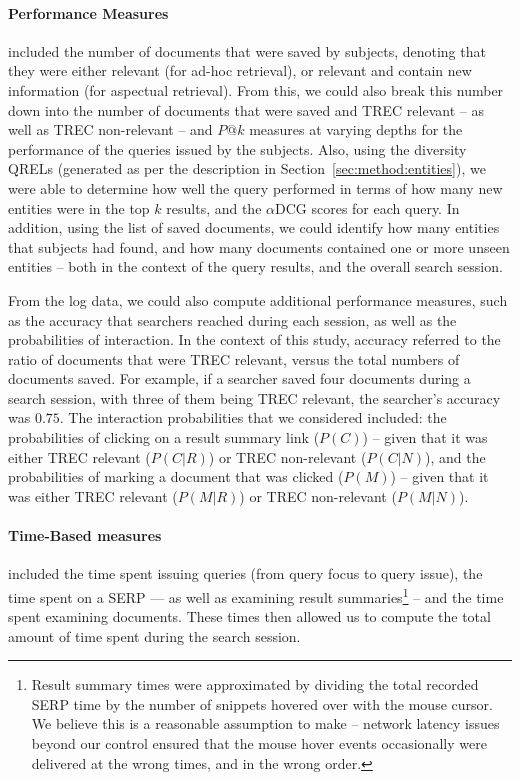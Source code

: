 \paragraph{Performance Measures} included the number of documents that were saved by subjects, denoting that they were either relevant (for ad-hoc retrieval), or relevant and contain new information (for aspectual retrieval). From this, we could also break this number down into the number of documents that were saved and TREC relevant -- as well as TREC non-relevant -- and $P@k$ measures at varying depths for the performance of the queries issued by the subjects. Also, using the diversity QRELs (generated as per the description in Section~\ref{sec:method:entities}), we were able to determine how well the query performed in terms of how many new entities were in the top $k$ results, and the $\alpha$DCG scores for each query. In addition, using the list of saved documents, we could identify how many entities that subjects had found, and how many documents contained one or more unseen entities -- both in the context of the query results, and the overall search session.

From the log data, we could also compute additional performance measures, such as the accuracy that searchers reached during each session, as well as the probabilities of interaction. In the context of this study, accuracy referred to the ratio of documents that were TREC relevant, versus the total numbers of documents saved. For example, if a searcher saved four documents during a search session, with three of them being TREC relevant, the searcher's accuracy was $0.75$. The interaction probabilities that we considered included: the probabilities of clicking on a result summary link ($P(C)$) -- given that it was either TREC relevant ($P(C|R)$) or TREC non-relevant ($P(C|N)$), and the probabilities of marking a document that was clicked ($P(M)$) -- given that it was either TREC relevant ($P(M|R)$) or TREC non-relevant ($P(M|N)$).

\paragraph{Time-Based measures} included the time spent issuing queries (from query focus to query issue), the time spent on a SERP --- as well as examining result summaries\footnote{Result summary times were approximated by dividing the total recorded SERP time by the number of snippets hovered over with the mouse cursor. We believe this is a reasonable assumption to make -- network latency issues beyond our control ensured that the mouse hover events occasionally were delivered at the wrong times, and in the wrong order.} -- and the time spent examining documents. These times then allowed us to compute the total amount of time spent during the search session.

